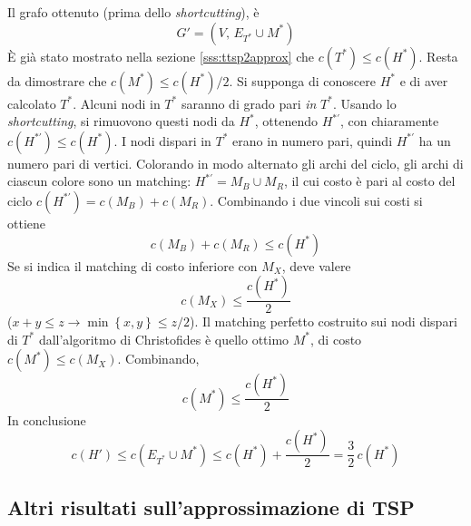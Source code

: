 
Il grafo ottenuto (prima dello \emph{shortcutting}), è
\begin{equation*}
    G' = 
    (
        V, \,
        E_{T^*}
        \cup
        M^*
    )
\end{equation*}
È già stato mostrato nella sezione \ref{sss:ttsp2approx} che
$ c(T^*) \leq c(H^*) $.
Resta da dimostrare che
$
    c( M^*)
    \leq
    c\left( H^* \right) / 2
$.
Si supponga di conoscere $H^*$ e di aver calcolato $T^*$. Alcuni nodi in $T^*$ saranno di grado pari \emph{in} $T^*$. Usando lo \emph{shortcutting}, si rimuovono questi nodi da $
H^*
$, ottenendo $
H^{*'}
$, con chiaramente $
c( H^{*'})
\leq
c(H^* )
$.
I nodi dispari in $T^*$ erano in numero pari, quindi $
H^{*'}
$ ha un numero pari di vertici.
Colorando in modo alternato gli archi del ciclo, gli archi di ciascun colore sono un matching: $
H^{*'}
= M_B \cup M_R
$, il cui costo è pari al costo del ciclo $
c( H^{*'}) = c(M_B) + c(M_R)
$. Combinando i due vincoli sui costi si ottiene
\begin{equation*}
    c(M_B) + c(M_R)
    \leq
    c(H^* )
\end{equation*}
Se si indica il matching di costo inferiore con $M_X$, deve valere
\begin{equation*}
    c(M_X)
    \leq
    \frac{
    c(H^* )
    }{2}
\end{equation*}
($x+y\leq z \to \min \left\{ x,y \right\} \leq z/2$).
Il matching perfetto 
costruito sui nodi dispari di $T^*$
dall'algoritmo di Christofides è quello ottimo $M^*$, di costo $
    c(M^*)
    \leq
    c(M_X)
$. Combinando,
\begin{equation*}
    c( M^*)
    \leq
    \frac{c\left( H^* \right)}{2}
\end{equation*}
In conclusione
\begin{equation*}
    c (H') \leq
    c ( E_{T^*} \cup M^*) \leq 
    c\left( H^* \right)
    +
    \frac{c\left( H^* \right)}{2}
    =
    \frac{3}{2} \,
    c\left( H^* \right)
\end{equation*}

\subsection{Altri risultati sull'approssimazione di TSP}

